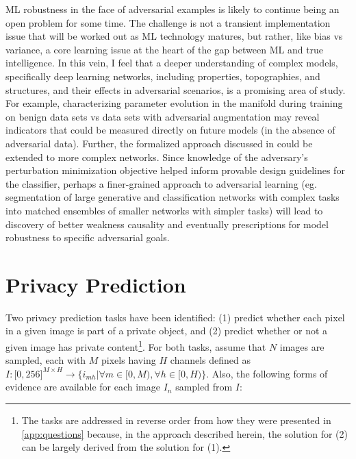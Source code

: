 \documentclass[11pt]{article}
\begin{document}
ML robustness in the face of adversarial examples is likely to continue being an open problem for some time.  The challenge is not a transient implementation issue that will be worked out as ML technology matures, but rather, like bias vs variance, a core learning issue at the heart of the gap between ML and true intelligence.  In this vein, I feel that a deeper understanding of complex models, specifically deep learning networks, including properties, topographies, and structures, and their effects in adversarial scenarios, is a promising area of study.  For example, characterizing parameter evolution in the manifold during training on benign data sets vs data sets with adversarial augmentation may reveal indicators that could be measured directly on future models (in the absence of adversarial data).  Further, the formalized approach discussed in \cite{russu2016secure} could be extended to more complex networks.  Since knowledge of the adversary's perturbation minimization objective helped inform provable design guidelines for the classifier, perhaps a finer-grained approach to adversarial learning (eg. segmentation of large generative and classification networks with complex tasks into matched ensembles of smaller networks with simpler tasks) will lead to discovery of better weakness causality and eventually prescriptions for model robustness to specific adversarial goals.


\newpage
\section{Privacy Prediction}\label{sec:privpred}

Two privacy prediction tasks have been identified: (1) predict whether each pixel in a given image is part of a private object, and (2) predict whether or not a given image has private content\footnote{The tasks are addressed in reverse order from how they were presented in \ref{app:questions} because, in the approach described herein, the solution for (2) can be largely derived from the solution for (1).}.  For both tasks, assume that $N$ images are sampled, each with $M$ pixels having $H$ channels defined as $I : {\lbrack0,256\rbrack}^{M \times H} \rightarrow \{i_{mh} | \forall m \in \lbrack0,M), \forall h \in \lbrack0,H) \}$.  Also, the following forms of evidence are available for each image $I_n$ sampled from $I$:
\end{document}
